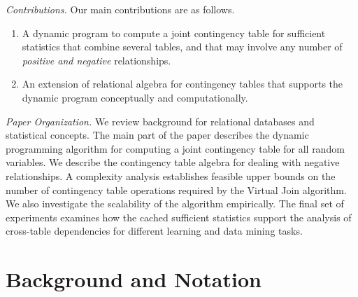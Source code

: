\documentclass{acm_proc_article-sp}
\begin{document}
\emph{Contributions.} Our main contributions 
are as follows.
\begin{enumerate}
\item A dynamic program to compute a joint contingency table for sufficient statistics that combine several tables, and that may involve any number of {\em positive and negative }relationships.
\item An extension of relational algebra for contingency tables that supports the dynamic program conceptually and computationally.
\end{enumerate}

\emph{Paper Organization.} 
We review background for relational databases and statistical concepts. 
The main part of the paper describes the dynamic programming algorithm for computing a joint contingency table for all random variables. 
We describe the contingency table algebra for dealing with negative relationships. 
A complexity analysis establishes feasible upper bounds on the number of contingency table operations required by the Virtual Join algorithm. 
We also investigate the scalability of the algorithm empirically. 
The final set of experiments examines how the cached sufficient statistics support the analysis of cross-table dependencies for different learning and data mining tasks.


 
\section{Background and Notation}
\end{document}
